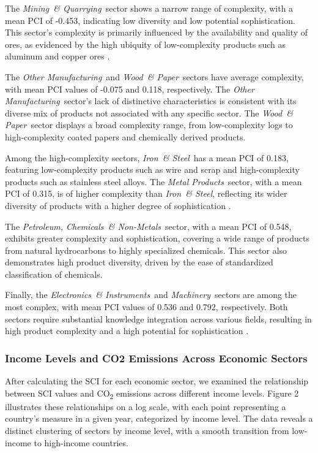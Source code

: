 \documentclass[10pt]{article}
\newcommand{\EL}{\textit{Electronics~\& Instruments}}
\newcommand{\IR}{\textit{Iron~\& Steel}}
\newcommand{\MA}{\textit{Machinery}}
\newcommand{\ME}{\textit{Metal Products}}
\newcommand{\MI}{\textit{Mining~\& Quarrying}}
\newcommand{\OT}{\textit{Other Manufacturing}}
\newcommand{\PE}{\textit{Petroleum, Chemicals~\& Non-Metals}}
\newcommand{\WO}{\textit{Wood~\& Paper}}
\begin{document}
The \MI\ sector shows a narrow range of complexity, with a mean PCI of -0.453, indicating low diversity and low potential sophistication. This sector's complexity is primarily influenced by the availability and quality of ores, as evidenced by the high ubiquity of low-complexity products such as aluminum and copper ores \citep{MiningSector}.

The \OT\ and \WO\ sectors have average complexity, with mean PCI values of -0.075 and 0.118, respectively. The \OT\ sector's lack of distinctive characteristics is consistent with its diverse mix of products not associated with any specific sector. The \WO\ sector displays a broad complexity range, from low-complexity logs to high-complexity coated papers and chemically derived products.

Among the high-complexity sectors, \IR\ has a mean PCI of 0.183, featuring low-complexity products such as wire and scrap and high-complexity products such as stainless steel alloys. The \ME\ sector, with a mean PCI of 0.315, is of higher complexity than \IR, reflecting its wider diversity of products with a higher degree of sophistication \citep{felipeProductComplexityEconomic2012}.

The \PE\ sector, with a mean PCI of 0.548, exhibits greater complexity and sophistication, covering a wide range of products from natural hydrocarbons to highly specialized chemicals. This sector also demonstrates high product diversity, driven by the ease of standardized classification of chemicals.

Finally, the \EL\ and \MA\ sectors are among the most complex, with mean PCI values of 0.536 and 0.792, respectively. Both sectors require substantial knowledge integration across various fields, resulting in high product complexity and a high potential for sophistication \citep{10.1093/icc/dtm006, Turco2020The}.

\subsubsection{Income Levels and CO2 Emissions Across Economic Sectors}
After calculating the SCI for each economic sector, we examined the relationship between SCI values and CO\textsubscript{2} emissions across different income levels. Figure 2 illustrates these relationships on a log scale, with each point representing a country's measure in a given year, categorized by income level. The data reveals a distinct clustering of sectors by income level, with a smooth transition from low-income to high-income countries.
\end{document}
